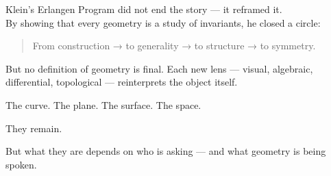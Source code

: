 \documentclass[9pt]{article}
\begin{document}
\noindent
Klein’s Erlangen Program did not end the story — it reframed it.  \\

\noindent
By showing that every geometry is a study of invariants, he closed a circle:\\

\begin{quote}
From construction → to generality → to structure → to symmetry.
\end{quote}

\noindent
But no definition of geometry is final.  
Each new lens — visual, algebraic, differential, topological — reinterprets the object itself.

The curve. The plane. The surface. The space.

They remain.

But what they are depends on who is asking — and what geometry is being spoken.
\end{document}
